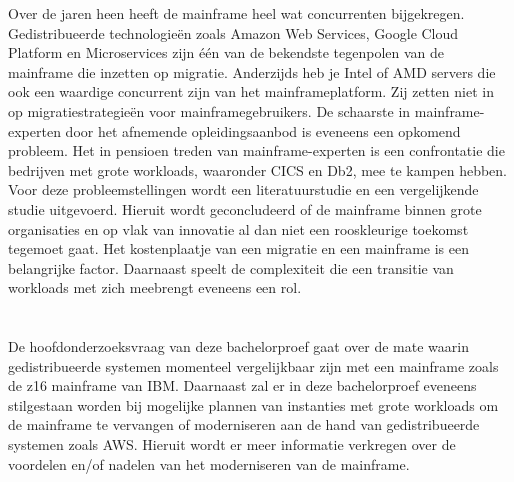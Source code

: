 Over de jaren heen heeft de mainframe heel wat concurrenten bijgekregen. Gedistribueerde technologieën zoals Amazon Web Services, Google Cloud Platform en Microservices zijn één van de bekendste tegenpolen van de mainframe die inzetten op migratie. Anderzijds heb je Intel of AMD servers die ook een waardige concurrent zijn van het mainframeplatform. Zij zetten niet in op migratiestrategieën voor mainframegebruikers. De schaarste in mainframe-experten door het afnemende opleidingsaanbod is eveneens een opkomend probleem. Het in pensioen treden van mainframe-experten is een confrontatie die bedrijven met grote workloads, waaronder CICS en Db2, mee te kampen hebben. Voor deze probleemstellingen wordt een literatuurstudie en een vergelijkende studie uitgevoerd. Hieruit wordt geconcludeerd of de mainframe binnen grote organisaties en op vlak van innovatie al dan niet een rooskleurige toekomst tegemoet gaat. Het kostenplaatje van een migratie en een mainframe is een belangrijke factor. Daarnaast speelt de complexiteit die een transitie van workloads met zich meebrengt eveneens een rol. 

\section{}
\label{sec:onderzoeksvraag}

De hoofdonderzoeksvraag van deze bachelorproef gaat over de mate waarin gedistribueerde systemen momenteel vergelijkbaar zijn met een mainframe zoals de z16 mainframe van IBM. Daarnaast zal er in deze bachelorproef eveneens stilgestaan worden bij mogelijke plannen van instanties met grote workloads om de mainframe te vervangen of moderniseren aan de hand van gedistribueerde systemen zoals AWS. Hieruit wordt er meer informatie verkregen over de voordelen en/of nadelen van het moderniseren van de mainframe.

\section{}
\label{sec:onderzoeksdoelstelling}

\subsection{}

